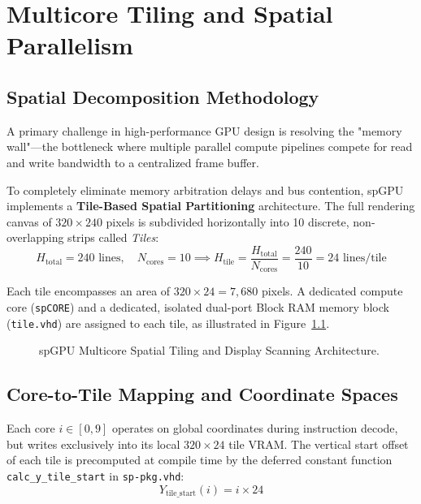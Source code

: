 \chapter{Multicore Tiling and Spatial Parallelism}
\label{chap:multicore_tiling}

\section{Spatial Decomposition Methodology}
A primary challenge in high-performance GPU design is resolving the "memory wall"---the bottleneck where multiple parallel compute pipelines compete for read and write bandwidth to a centralized frame buffer.

To completely eliminate memory arbitration delays and bus contention, spGPU implements a \textbf{Tile-Based Spatial Partitioning} architecture. The full rendering canvas of $320 \times 240$ pixels is subdivided horizontally into 10 discrete, non-overlapping strips called \textit{Tiles}:
\begin{equation}
H_{\text{total}} = 240 \text{ lines}, \quad N_{\text{cores}} = 10 \implies H_{\text{tile}} = \frac{H_{\text{total}}}{N_{\text{cores}}} = \frac{240}{10} = 24 \text{ lines/tile}
\end{equation}

Each tile encompasses an area of $320 \times 24 = 7{,}680$ pixels. A dedicated compute core (\texttt{spCORE}) and a dedicated, isolated dual-port Block RAM memory block (\texttt{tile.vhd}) are assigned to each tile, as illustrated in Figure~\ref{fig:multicore_tiling}.

\begin{figure}[htbp]
\centering
\resizebox{0.92\textwidth}{!}{
    
}
\caption{spGPU Multicore Spatial Tiling and Display Scanning Architecture.}
\label{fig:multicore_tiling}
\end{figure}

\section{Core-to-Tile Mapping and Coordinate Spaces}
Each core $i \in [0, 9]$ operates on global coordinates during instruction decode, but writes exclusively into its local $320 \times 24$ tile VRAM. The vertical start offset of each tile is precomputed at compile time by the deferred constant function \texttt{calc\_y\_tile\_start} in \texttt{sp-pkg.vhd}:
\begin{equation}
Y_{\text{tile\_start}}(i) = i \times 24
\end{equation}

